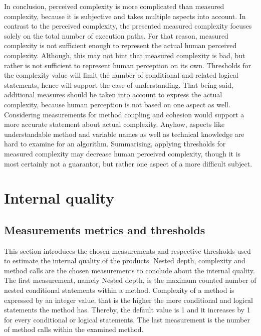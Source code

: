 \documentclass[conference]{IEEEtran}
\begin{document}
In conclusion, perceived complexity is more complicated than measured complexity, because it is subjective and takes multiple aspects into account. In contrast to the perceived complexity, the presented measured complexity focuses solely on the total number of execution paths. For that reason, measured complexity is not sufficient enough to represent the actual human perceived complexity. Although, this may not hint that measured complexity is bad, but rather is not sufficient to represent human perception on its own. Thresholds for the complexity value will limit the number of conditional and related logical statements, hence will support the ease of understanding. That being said, additional measures should be taken into account to express the actual complexity, because human perception is not based on one aspect as well. Considering measurements for method coupling and cohesion would support a more accurate statement about actual complexity. Anyhow, aspects like understandable method and variable names as well as technical knowledge are hard to examine for an algorithm. Summarising, applying thresholds for measured complexity may decrease human perceived complexity, though it is most certainly not a guarantor, but rather one aspect of a more difficult subject.

\section{Internal quality}
\label{sec:internal quality}

\subsection{Measurements metrics and thresholds}
This section introduces the chosen measurements and respective thresholds used to estimate the internal quality of the products. Nested depth, complexity and method calls are the chosen measurements to conclude about the internal quality. The first measurement, namely Nested depth, is the maximum counted number of nested conditional statements within a method. Complexity of a method is expressed by an integer value, that is the higher the more conditional and logical statements the method has. Thereby, the default value is 1 and it increases by 1 for every conditional or logical statements. The last measurement is the number of method calls within the examined method. 
\end{document}
